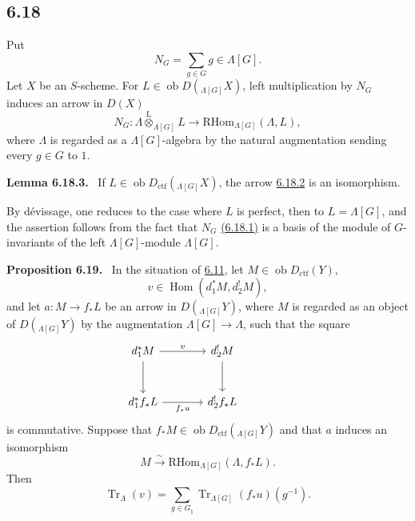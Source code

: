 \documentclass[11pt]{article}
\newenvironment{statement}[1]{\par\medskip\noindent\textbf{#1.}\ }{\par\medskip}
\DeclareMathOperator{\Hom}{Hom}
\providecommand{\RHom}{\mathrm{RHom}}
\providecommand{\Tr}{\operatorname{Tr}}
\providecommand{\Tr}{\operatorname{Tr}}
\providecommand{\lten}{\overset{\mathrm L}{\otimes}}
\providecommand{\Ob}{\operatorname{ob}}
\providecommand{\Tr}{\operatorname{Tr}}
\providecommand{\RHom}{\mathrm{RHom}}
\providecommand{\Hom}{\operatorname{Hom}}
\providecommand{\lten}{\overset{\mathrm L}{\otimes}}
\providecommand{\RHom}{\mathrm R\mathcal{H}om}
\providecommand{\lten}{\overset{\mathrm L}{\otimes}}
\providecommand{\Ob}{\operatorname{ob}}
\providecommand{\Tr}{\operatorname{Tr}}
\providecommand{\lten}{\overset{\mathrm L}{\otimes}}
\providecommand{\lten}{\overset{\mathrm L}{\otimes}}
\providecommand{\Ob}{\operatorname{Ob}}
\providecommand{\lten}{\overset{\mathrm L}{\otimes}}
\providecommand{\RHom}{\mathrm{RHom}}
\providecommand{\Hom}{\operatorname{Hom}}
\providecommand{\Tr}{\operatorname{Tr}}
\providecommand{\Ob}{\operatorname{ob}}
\providecommand{\Ob}{\operatorname{Ob}}
\providecommand{\lten}{\overset{\mathrm L}{\otimes}}
\begin{document}
\subsection*{6.18}\label{sga5:IIIB:subsection:6.18}
Put
\begin{equation}
N_G=\sum_{g\in G} g\in\Lambda[G].
\tag{6.18.1}\label{sga5:IIIB:equation:6.18.1}
\end{equation}
Let $X$ be an $S$-scheme. For $L\in\Ob D({}_{\Lambda[G]}X)$, left multiplication by $N_G$ induces an arrow in $D(X)$
\begin{equation}
N_G:\Lambda\lten_{\Lambda[G]}L
\longrightarrow
\RHom_{\Lambda[G]}(\Lambda,L),
\tag{6.18.2}\label{sga5:IIIB:equation:6.18.2}
\end{equation}
where $\Lambda$ is regarded as a $\Lambda[G]$-algebra by the natural augmentation sending every $g\in G$ to $1$.

\label{sga5:IIIB:lemma:6.18.3}\begin{statement}{Lemma 6.18.3}
If $L\in\Ob D_{\mathrm{ctf}}({}_{\Lambda[G]}X)$, the arrow \hyperref[sga5:IIIB:equation:6.18.2]{6.18.2} is an isomorphism.
\end{statement}

By dévissage, one reduces to the case where $L$ is perfect, then to $L=\Lambda[G]$, and the assertion follows from the fact that $N_G$ \hyperref[sga5:IIIB:equation:6.18.1]{(6.18.1)} is a basis of the module of $G$-invariants of the left $\Lambda[G]$-module $\Lambda[G]$.

\label{sga5:IIIB:proposition:6.19}\begin{statement}{Proposition 6.19}
In the situation of \hyperref[sga5:IIIB:subsection:6.11]{6.11}, let $M\in\Ob D_{\mathrm{ctf}}(Y)$,
\[
v\in\Hom(d_1^*M,d_2^!M),
\]
and let $a:M\to f_*L$ be an arrow in $D({}_{\Lambda[G]}Y)$, where $M$ is regarded as an object of $D({}_{\Lambda[G]}Y)$ by the augmentation $\Lambda[G]\to\Lambda$, such that the square
\[
\begin{tikzcd}[column sep=large,row sep=large]
d_1^*M \arrow[r,"v"] \arrow[d] & d_2^!M \arrow[d] & {}\\
d_1^*f_*L \arrow[r,"f_*u"'] & d_2^!f_*L
\end{tikzcd}
\]
is commutative. Suppose that $f_*M\in\Ob D_{\mathrm{ctf}}({}_{\Lambda[G]}Y)$ and that $a$ induces an isomorphism
\[
M\xrightarrow{\sim}\RHom_{\Lambda[G]}(\Lambda,f_*L).
\]
Then
\begin{equation}
\Tr_{\Lambda}(v)=
\sum_{g\in G_{\natural}}\Tr_{\Lambda[G]}(f_*u)(g^{-1}).
\tag{6.19.1}\label{sga5:IIIB:equation:6.19.1}
\end{equation}
\end{statement}
\end{document}
